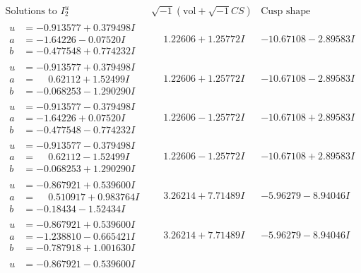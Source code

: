 \documentclass[1p]{elsarticle_modified}
\theoremstyle{definition}
\newcommand{\I}{\sqrt{-1}}
\begin{document}
$$\begin{array}{c|c|c}  
\text{Solutions to }I^u_{2}& \I (\text{vol} + \sqrt{-1}CS) & \text{Cusp shape}\\
 \hline 
\begin{aligned}
u &= -0.913577 + 0.379498 I \\
a &= -1.64226 - 0.07520 I \\
b &= -0.477548 + 0.774232 I\end{aligned}
 & \phantom{-}1.22606 + 1.25772 I & -10.67108 - 2.89583 I \\ \hline\begin{aligned}
u &= -0.913577 + 0.379498 I \\
a &= \phantom{-}0.62112 + 1.52499 I \\
b &= -0.068253 - 1.290290 I\end{aligned}
 & \phantom{-}1.22606 + 1.25772 I & -10.67108 - 2.89583 I \\ \hline\begin{aligned}
u &= -0.913577 - 0.379498 I \\
a &= -1.64226 + 0.07520 I \\
b &= -0.477548 - 0.774232 I\end{aligned}
 & \phantom{-}1.22606 - 1.25772 I & -10.67108 + 2.89583 I \\ \hline\begin{aligned}
u &= -0.913577 - 0.379498 I \\
a &= \phantom{-}0.62112 - 1.52499 I \\
b &= -0.068253 + 1.290290 I\end{aligned}
 & \phantom{-}1.22606 - 1.25772 I & -10.67108 + 2.89583 I \\ \hline\begin{aligned}
u &= -0.867921 + 0.539600 I \\
a &= \phantom{-}0.510917 + 0.983764 I \\
b &= -0.18434 - 1.52434 I\end{aligned}
 & \phantom{-}3.26214 + 7.71489 I & -5.96279 - 8.94046 I \\ \hline\begin{aligned}
u &= -0.867921 + 0.539600 I \\
a &= -1.238810 - 0.665421 I \\
b &= -0.787918 + 1.001630 I\end{aligned}
 & \phantom{-}3.26214 + 7.71489 I & -5.96279 - 8.94046 I \\ \hline\begin{aligned}
u &= -0.867921 - 0.539600 I \\

\end{aligned}
\end{array}$$
\end{document}
